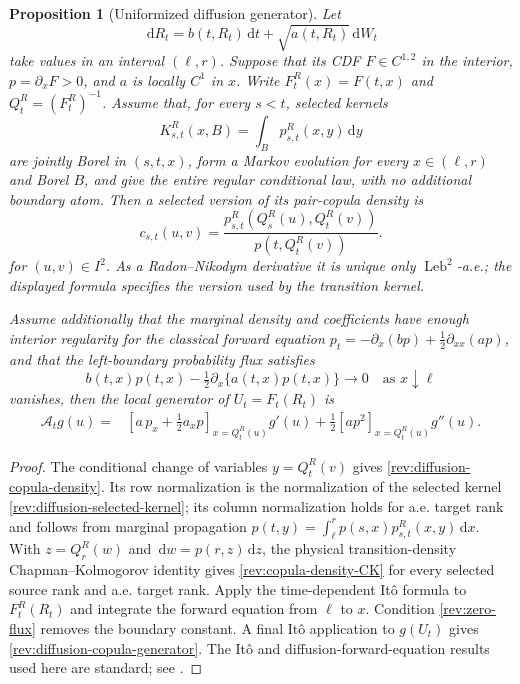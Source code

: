 \documentclass[11pt]{article}
\newtheorem{proposition}[definition]{Proposition}
\theoremstyle{remark}
\newcommand{\dd}{\,\mathrm d}
\newcommand{\Leb}{\operatorname{Leb}}
\begin{document}
\begin{proposition}[Uniformized diffusion generator]
\label{rev:prop-diffusion-copula-generator}
Let
\begin{equation}
\dd R_t=b(t,R_t)\dd t+\sqrt{a(t,R_t)}\dd W_t
\label{rev:general-diffusion}
\end{equation}
take values in an interval $(\ell,r)$.  Suppose that its CDF
$F\in C^{1,2}$ in the interior, $p=\partial_xF>0$, and $a$ is locally $C^1$
in $x$.  Write $F_t^R(x)=F(t,x)$ and $Q_t^R=(F_t^R)^{-1}$.  Assume that, for
every $s<t$, selected kernels
\begin{equation}
K^R_{s,t}(x,B)=\int_Bp^R_{s,t}(x,y)\dd y
\label{rev:diffusion-selected-kernel}
\end{equation}
are jointly Borel in $(s,t,x)$, form a Markov evolution for every
$x\in(\ell,r)$ and Borel $B$, and give the entire regular conditional law,
with no additional boundary atom.  Then a selected version of its pair-copula
density is
\begin{equation}
c_{s,t}(u,v)=
\frac{p^R_{s,t}\!\left(Q_s^R(u),Q_t^R(v)\right)}
     {p\!\left(t,Q_t^R(v)\right)}.
\label{rev:diffusion-copula-density}
\end{equation}
for $(u,v)\in I^2$.  As a Radon--Nikodym derivative it is unique only
$\Leb^2$-a.e.; the displayed formula specifies the version used by the
transition kernel.

Assume additionally that the marginal density and coefficients have enough
interior regularity for the classical forward equation
$p_t=-\partial_x(bp)+\tfrac12\partial_{xx}(ap)$, and that the left-boundary
probability flux satisfies
\begin{equation}
b(t,x)p(t,x)-\tfrac12\partial_x\{a(t,x)p(t,x)\}
\longrightarrow0\quad\text{as }x\downarrow\ell
\label{rev:zero-flux}
\end{equation}
vanishes, then the local generator of $U_t=F_t(R_t)$ is
\begin{align}
\mathcal A_tg(u)
={}&\left[a\,p_x+\tfrac12a_xp\right]_{x=Q_t^R(u)}g'(u)
+\frac12\left[ap^2\right]_{x=Q_t^R(u)}g''(u).
\label{rev:diffusion-copula-generator}
\end{align}
\end{proposition}

\begin{proof}
The conditional change of variables $y=Q_t^R(v)$ gives
\eqref{rev:diffusion-copula-density}.  Its row normalization is the
normalization of the selected kernel \eqref{rev:diffusion-selected-kernel}; its
column normalization holds for a.e. target rank and follows from marginal
propagation
$p(t,y)=\int_\ell^r p(s,x)p^R_{s,t}(x,y)\dd x$.
With $z=Q_r^R(w)$ and $\dd w=p(r,z)\dd z$, the physical transition-density
Chapman--Kolmogorov identity gives \eqref{rev:copula-density-CK} for every
selected source rank and a.e. target rank.  Apply the time-dependent It\^o
formula to $F_t^R(R_t)$ and integrate the forward equation from $\ell$ to $x$.
Condition \eqref{rev:zero-flux} removes the boundary constant.  A final It\^o
application to $g(U_t)$ gives \eqref{rev:diffusion-copula-generator}.  The
It\^o and diffusion-forward-equation results used here are standard; see
\citet[Chapters~5--6]{KaratzasShreve1991}.
\end{proof}
\end{document}
